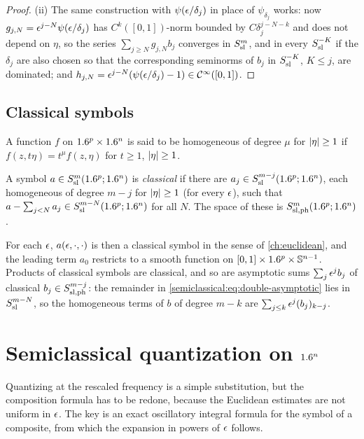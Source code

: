 \begin{proof}
  (ii) The same construction with $\psi(\epsilon/\delta_j)$ in place of
  $\psi_{\delta_j}$ works: now $g_{j,N}=\epsilon^{j-N}\psi(\epsilon/\delta_j)$ has
  $C^k([0,1])$-norm bounded by $C\delta_j^{j-N-k}$ and does not depend on
  $\eta$, so the series $\sum_{j\ge N}g_{j,N}b_j$ converges in $S^{m}_{\mathrm{sl}}$, and
  in every $S^{-K}_{\mathrm{sl}}$ if the $\delta_j$ are also chosen so that the
  corresponding seminorms of $b_j$ in $S^{-K}_{\mathrm{sl}}$, $K\le j$, are dominated;
  and $h_{j,N}=\epsilon^{j-N}(\psi(\epsilon/\delta_j)-1)\in\mathcal{C}^\infty([0,1])$.
\end{proof}

\subsection{Classical symbols}
A function $f$ on $1.6^p\times1.6^n$ is said to be homogeneous of degree $\mu$
for $\lvert \eta\rvert\ge1$ if $f(z,t\eta)=t^\mu f(z,\eta)$ for $t\ge1$, $\lvert \eta\rvert\ge1$.

\begin{definition}\label{semiclassical:def:classical}
  A symbol $a\in S^{m}_{\mathrm{sl}}(1.6^p;1.6^n)$ is \emph{classical} if there are
  $a_j\in S^{m-j}_{\mathrm{sl}}(1.6^p;1.6^n)$, each homogeneous of degree $m-j$ for
  $\lvert \eta\rvert\ge1$ (for every $\epsilon$), such that
  $a-\sum_{j<N}a_j\in S^{m-N}_{\mathrm{sl}}(1.6^p;1.6^n)$ for all $N$. The space of these is
  $S^{m}_{\mathrm{sl,ph}}(1.6^p;1.6^n)$.
\end{definition}

For each $\epsilon$, $a(\epsilon,\cdot,\cdot)$ is then a classical symbol in the
sense of \cref{ch:euclidean}, and the leading term $a_0$ restricts to a smooth
function on $[0,1]\times1.6^p\times\mathbb{S}^{n-1}$. Products of classical
symbols are classical, and so are asymptotic sums
$\sum_j\epsilon^jb_j$ of classical $b_j\in S^{m-j}_{\mathrm{sl,ph}}$: the
remainder in \eqref{semiclassical:eq:double-asymptotic} lies in $S^{m-N}_{\mathrm{sl}}$, so
the homogeneous terms of $b$ of degree $m-k$ are
$\sum_{j\le k}\epsilon^j(b_j)_{k-j}$.

\section{Semiclassical quantization on \texorpdfstring{$1.6^n$}{Rn}}\label{semiclassical:sec:quantization}
Quantizing at the rescaled frequency is a simple substitution, but the
composition formula has to be redone, because the Euclidean estimates are not
uniform in $\epsilon$. The key is an exact oscillatory integral formula for the
symbol of a composite, from which the expansion in powers of $\epsilon$ follows.

